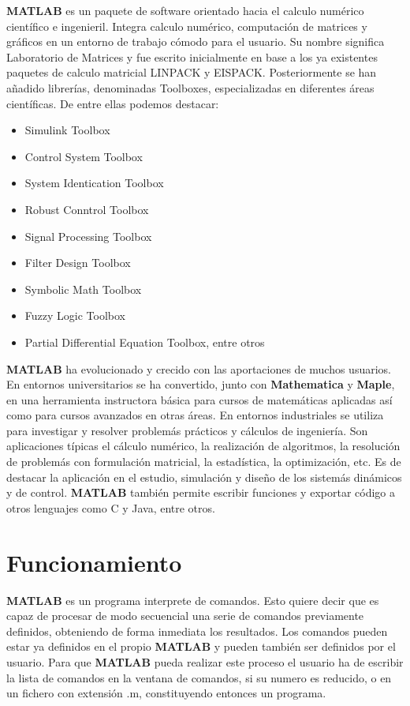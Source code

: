 \textbf{MATLAB} es un paquete de software orientado hacia el calculo numérico científico e ingenieril. Integra calculo numérico, computación de matrices y gráficos en un entorno de trabajo cómodo para el usuario. Su nombre significa Laboratorio de Matrices y fue escrito inicialmente en base a los ya existentes paquetes de calculo matricial LINPACK y EISPACK. Posteriormente se han añadido librerías, denominadas Toolboxes, especializadas en diferentes áreas científicas. De entre ellas podemos destacar:
\begin{itemize}
\item Simulink Toolbox
\item Control System Toolbox
\item System Identication Toolbox
\item Robust Conntrol Toolbox
\item Signal Processing Toolbox
\item Filter Design Toolbox
\item Symbolic Math Toolbox
\item Fuzzy Logic Toolbox
\item Partial Differential Equation Toolbox, entre otros
\end{itemize}

\textbf{MATLAB} ha evolucionado y crecido con las aportaciones de muchos usuarios. En entornos universitarios se ha convertido, junto con \textbf{Mathematica} y \textbf{Maple}, en una herramienta instructora básica para cursos de matemáticas aplicadas así como para cursos avanzados en otras áreas. En entornos industriales se utiliza para investigar y resolver problemás prácticos y cálculos de ingeniería. Son aplicaciones típicas el cálculo numérico, la realización de algoritmos, la resolución de problemás con formulación matricial, la estadística, la optimización, etc. Es de destacar la aplicación en el estudio, simulación y diseño de los sistemás dinámicos y de control. \textbf{MATLAB} también permite escribir funciones y exportar código a otros lenguajes como C y Java, entre otros.

\section{Funcionamiento}

\textbf{MATLAB} es un programa interprete de comandos. Esto quiere decir que es capaz de procesar de modo secuencial una serie de comandos previamente definidos, obteniendo de forma inmediata los resultados. Los comandos pueden estar ya definidos en el propio \textbf{MATLAB} y pueden también ser definidos por el usuario. Para que \textbf{MATLAB} pueda realizar este proceso el usuario ha de escribir la lista de comandos en la ventana de comandos, si su numero es reducido, o en un fichero con extensión .m, constituyendo entonces un programa.

